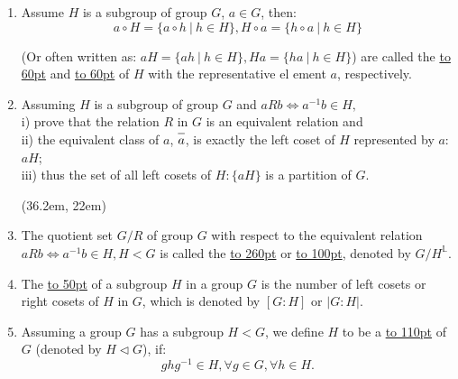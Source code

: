 \documentclass[12pt]{scrartcl}
\begin{document}
{{\begin{enumerate}[label=(\alph*)]
	\item Assume $H$ is a subgroup of group $G$, $a \in G$, then:
	$$a \circ H = \{a \circ h ~ | ~ h \in H\}, H \circ a = \{h \circ a ~ | ~ h \in H\}$$
	\begin{spacing}{1.2}(Or often written as:
	$aH = \{ah ~ | ~ h \in H\}, Ha = \{ha ~ | ~ h \in H\}$) are called the \underline{\hbox to 60pt{}} and \underline{\hbox to 60pt{}} of $H$ with the representative el ement $a$, respectively.\end{spacing}

	\item \begin{spacing}{1.2}Assuming $H$ is a subgroup of group $G$ and $aRb \iff a^{-1}b \in H,$\\ i) prove that the relation $R$ in $G$ is an equivalent relation and \\ii) the equivalent class of $a$, $\overline{a\vphantom{b}}$, is exactly the left coset of $H$ represented by $a$: $aH$; \\iii) thus the set of all left cosets of $H: \{aH\}$ is a partition of $G$.	\end{spacing}

	\vspace{0.5em}
	\framebox(36.2em, 22em){}
	\vspace{0.3em}

	\item \begin{spacing}{1.2}The quotient set $G/R$ of group $G$ with respect to the equivalent relation $aRb \iff a^{-1}b \in H, H < G$ is called the \underline{\hbox to 260pt{}} or \underline{\hbox to 100pt{}}, denoted by $G/H^{\mathbb{L}}$.\end{spacing}

	\item \begin{spacing}{1.2}The \underline{\hbox to 50pt{}} of a subgroup $H$ in a group $G$ is the number of left cosets or right cosets of $H$ in $G$, which is denoted by $[G:H]$ or $|G:H|$.
	\end{spacing}

\newpage
	\item \begin{spacing}{1.2}Assuming a group $G$ has a subgroup $H<G$, we define $H$ to be a \underline{\hbox to 110pt{}} of $G$ (denoted by $H \lhd G$), if: $$ghg^{-1} \in H, \forall g \in G, \forall h \in H.$$\end{spacing}


\end{enumerate}}}
\end{document}

